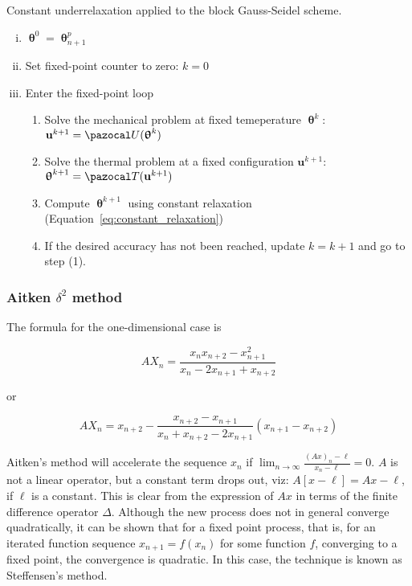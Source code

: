 \begin{framedbox}[htb]
  \caption{Constant underrelaxation applied to the block Gauss-Seidel scheme.}
  \label{box:constant_underrelaxation}
  \begin{center}
    \begin{minipage}{0.9\textwidth}
    \begin{enumerate}[(i)]
    \item \(\bm\uptheta^0 = \bm\uptheta_{n+1}^p\)
    \item Set fixed-point counter to zero: \(k=0\)
    \item Enter the fixed-point loop
    \begin{enumerate}[(1)]
      \item Solve the mechanical problem at fixed temeperature \(\bm \uptheta^k\): \(\mathbf u^{k+1} = \pazocal U(\bm \uptheta^k)\)
      \item Solve the thermal problem at a fixed configuration \(\mathbf u^{k+1}\): \(\bm \uptheta^{k+1} = \pazocal T(\mathbf u^{k+1})\)
      \item Compute \(\bm \uptheta^{k+1}\) using constant relaxation (Equation~\eqref{eq:constant_relaxation})
      \item If the desired accuracy has not been reached, update \(k=k+1\) and go to step (1).
    \end{enumerate}
    \end{enumerate}
    \end{minipage}
  \end{center}
\end{framedbox}

\subsubsection{Aitken \(\delta^2\) method}

The formula for the one-dimensional case is

$$
AX_n = \frac{x_n x_{n+2} - x_{n+1}^2}{x_n-2x_{n+1}+ x_{n+2} }
$$

or

$$
AX_n = x_{n+2} - \frac{x_{n+2} - x_{n+1} }{x_n + x_{n+2} - 2 x_{n+1} }(x_{n+1}-x_{n+2})
$$

Aitken's method will accelerate the sequence $x_{n}$ if $\lim_{n \rightarrow \infty} \frac{(A x)_{n}-\ell}{x_{n}-\ell}=0$.
$A$ is not a linear operator, but a constant term drops out, viz: $A[x-\ell]=A x-\ell$, if $\ell$ is a constant. This is clear from the expression of $A x$ in terms of the finite difference operator $\Delta$.
Although the new process does not in general converge quadratically, it can be shown that for a fixed point process, that is, for an iterated function sequence $x_{n+1}=f\left(x_{n}\right)$ for some function $f$, converging to a fixed point, the convergence is quadratic. In this case, the technique is known as Steffensen's method.

